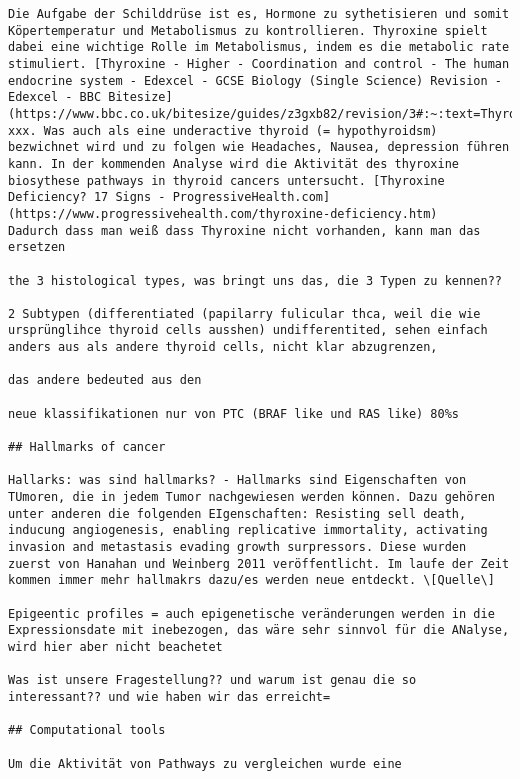 \documentclass[
  parskip,
  oneside]{scrreprt}
\begin{document}
\begin{verbatim}
Die Aufgabe der Schilddrüse ist es, Hormone zu sythetisieren und somit Köpertemperatur und Metabolismus zu kontrollieren. Thyroxine spielt dabei eine wichtige Rolle im Metabolismus, indem es die metabolic rate stimuliert. [Thyroxine - Higher - Coordination and control - The human endocrine system - Edexcel - GCSE Biology (Single Science) Revision - Edexcel - BBC Bitesize](https://www.bbc.co.uk/bitesize/guides/z3gxb82/revision/3#:~:text=Thyroxine%20is%20produced%20from%20the%20thyroid%20gland%2C%20which,development.%20Its%20levels%20are%20controlled%20by%20negative%20feedback.) xxx. Was auch als eine underactive thyroid (= hypothyroidsm) bezwichnet wird und zu folgen wie Headaches, Nausea, depression führen kann. In der kommenden Analyse wird die Aktivität des thyroxine biosythese pathways in thyroid cancers untersucht. [Thyroxine Deficiency? 17 Signs - ProgressiveHealth.com](https://www.progressivehealth.com/thyroxine-deficiency.htm)
Dadurch dass man weiß dass Thyroxine nicht vorhanden, kann man das ersetzen

the 3 histological types, was bringt uns das, die 3 Typen zu kennen??

2 Subtypen (differentiated (papilarry fulicular thca, weil die wie ursprünglihce thyroid cells ausshen) undifferentited, sehen einfach anders aus als andere thyroid cells, nicht klar abzugrenzen,

das andere bedeuted aus den

neue klassifikationen nur von PTC (BRAF like und RAS like) 80%s

## Hallmarks of cancer

Hallarks: was sind hallmarks? - Hallmarks sind Eigenschaften von TUmoren, die in jedem Tumor nachgewiesen werden können. Dazu gehören unter anderen die folgenden EIgenschaften: Resisting sell death, inducung angiogenesis, enabling replicative immortality, activating invasion and metastasis evading growth surpressors. Diese wurden zuerst von Hanahan und Weinberg 2011 veröffentlicht. Im laufe der Zeit kommen immer mehr hallmakrs dazu/es werden neue entdeckt. \[Quelle\]

Epigeentic profiles = auch epigenetische veränderungen werden in die Expressionsdate mit inebezogen, das wäre sehr sinnvol für die ANalyse, wird hier aber nicht beachetet

Was ist unsere Fragestellung?? und warum ist genau die so interessant?? und wie haben wir das erreicht=

## Computational tools

Um die Aktivität von Pathways zu vergleichen wurde eine


\end{verbatim}
\end{document}

